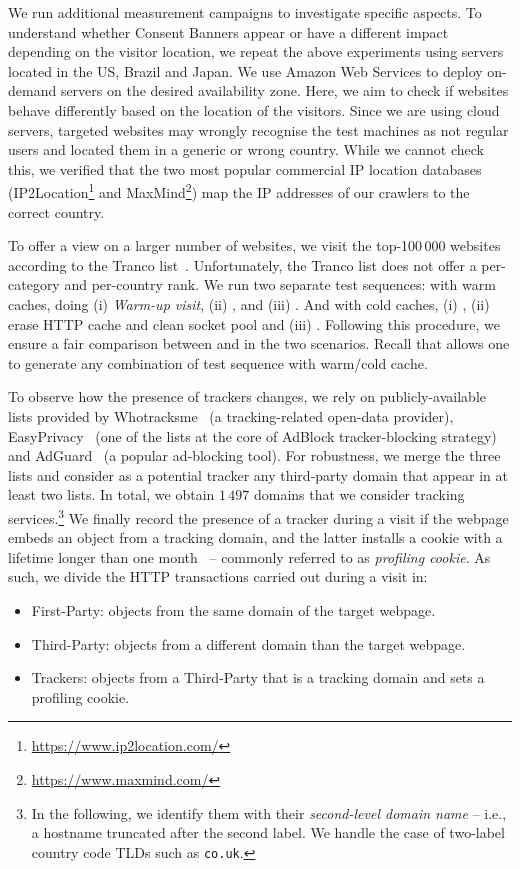 We run additional measurement campaigns to investigate specific aspects. To understand whether Consent Banners appear or have a different impact depending on the visitor location, we repeat the above experiments using servers located in the US, Brazil and Japan. We use Amazon Web Services to deploy on-demand servers on the desired availability zone. Here, we aim to check if websites behave differently based on the location of the visitors. Since we are using cloud servers, targeted websites may wrongly recognise the test machines as not regular users and located them in a generic or wrong country. While we cannot check this, we verified that the two most popular commercial IP location databases (IP2Location\footnote{\url{https://www.ip2location.com/}} and MaxMind\footnote{\url{https://www.maxmind.com/}}) map the IP addresses of our crawlers to the correct country. 

To offer a view on a larger number of websites, we visit the top-100\,000 websites according to the Tranco list~\cite{pochat2018tranco}. Unfortunately, the Tranco list does not offer a per-category and per-country rank. We run two separate test sequences: with warm caches, doing (i) \emph{Warm-up visit}, (ii) \BEFORE, and (iii) \AFTER. And with cold caches, (i) \BEFORE, (ii) erase HTTP cache and clean socket pool and (iii) \AFTER. Following this procedure, we ensure a fair comparison between \BEFORE and \AFTER in the two scenarios. Recall that \TOOL allows one to generate any combination of test sequence with warm/cold cache.

To observe how the presence of trackers changes, we rely on publicly-available lists provided by Whotracksme~\cite{whotracksme} (a tracking-related open-data provider), EasyPrivacy~\cite{easyprivacy} (one of the lists at the core of AdBlock tracker-blocking strategy) and AdGuard~\cite{adguard} (a popular ad-blocking tool). For robustness, we merge the three lists and consider as a potential tracker any third-party domain that appear in at least two lists. In total, we obtain $1\,497$ domains that we consider tracking services.\footnote{In the following, we identify them with their \emph{second-level domain name} -- i.e., a hostname truncated after the second label. We handle the case of two-label country code TLDs such as \texttt{co.uk}.} We finally record the presence of a tracker during a visit if the webpage embeds an object from a tracking domain, and the latter installs a cookie with a lifetime longer than one month~\cite{trevisan20194} -- commonly referred to as \textit{profiling cookie}. As such, we divide the HTTP transactions carried out during a visit in: 
\begin{itemize}
    \item First-Party: objects from the same domain of the target webpage.
    \item Third-Party: objects from a different domain than the target webpage.
    \item Trackers: objects from a Third-Party that is a tracking domain and sets a profiling cookie.
\end{itemize}
